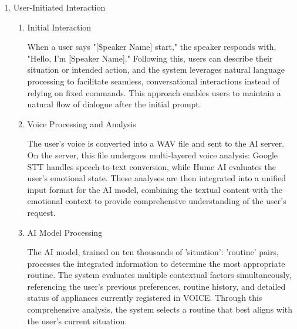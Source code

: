 \documentclass[conference]{IEEEtran}
\begin{document}
\begin{enumerate}[label=\arabic*]
    \item User-Initiated Interaction\par
    \vspace{0.3em}

    \begin{enumerate}[label=\arabic*)]
        \item Initial Interaction\par
        \vspace{0.3em}
        When a user says "[Speaker Name] start," the speaker responds with, "Hello, I'm [Speaker Name]." Following this, users can describe their situation or intended action, and the system leverages natural language processing to facilitate seamless, conversational interactions instead of relying on fixed commands. This approach enables users to maintain a natural flow of dialogue after the initial prompt.

        \vspace{0.5em}

        \item Voice Processing and Analysis\par
        \vspace{0.3em}
        The user's voice is converted into a WAV file and sent to the AI server. On the server, this file undergoes multi-layered voice analysis: Google STT handles speech-to-text conversion, while Hume AI evaluates the user's emotional state. These analyses are then integrated into a unified input format for the AI model, combining the textual content with the emotional context to provide comprehensive understanding of the user's request.

        \vspace{0.5em}

        \item AI Model Processing\par
        \vspace{0.3em}
        The AI model, trained on ten thousands of {'situation': 'routine'} pairs, processes the integrated information to determine the most appropriate routine. The system evaluates multiple contextual factors simultaneously, referencing the user's previous preferences, routine history, and detailed status of appliances currently registered in VOICE. Through this comprehensive analysis, the system selects a routine that best aligns with the user's current situation.


\end{enumerate}
\end{enumerate}
\end{document}
